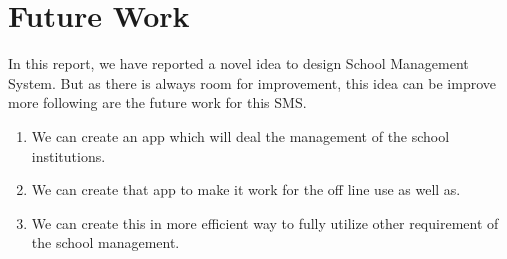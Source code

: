 \section{Future Work}
In this report, we have reported a novel idea to design School Management System. But as there is always room for improvement, this idea can be improve more following are the future work for this SMS.
\begin{enumerate}
\item We can create an app which will deal the management of the school institutions.
\item We can create that app to make it work for the off line use as well as.
\item We can create this in more efficient way to fully utilize other requirement of the school management. 
\end{enumerate}